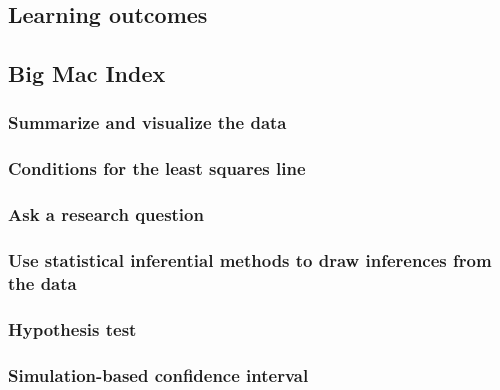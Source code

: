 \documentclass[
]{report}
\begin{document}
\subsection{Learning outcomes}\label{learning-outcomes-34}

\subsection{Big Mac Index}\label{big-mac-index}

\subsubsection*{Summarize and visualize the data}\label{summarize-and-visualize-the-data-7}

\subsubsection*{Conditions for the least squares line}\label{conditions-for-the-least-squares-line-1}

\subsubsection*{Ask a research question}\label{ask-a-research-question-8}

\subsubsection*{Use statistical inferential methods to draw inferences from the data}\label{use-statistical-inferential-methods-to-draw-inferences-from-the-data-10}

\subsubsection*{Hypothesis test}\label{hypothesis-test-7}

\subsubsection*{Simulation-based confidence interval}\label{simulation-based-confidence-interval-3}
\end{document}
